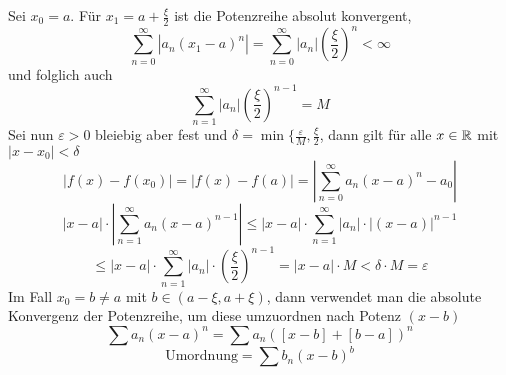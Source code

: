 \documentclass[../ana1u.tex]{subfiles}
\begin{document}
\begin{bew}
    Sei \(x_0 = a \). Für \(x_1 = a + \frac{\xi}{2} \) ist die Potenzreihe absolut konvergent, \dphp
    \[\sum_{n=0}^{\infty} |a_n(x_1-a)^n| = \sum_{n=0}^{\infty} |a_n| \left(\frac{\xi}{2}\right)^n < \infty \]
    und folglich auch 
    \[\sum_{n=1}^{\infty} |a_n| \left(\frac{\xi}{2}\right)^{n-1} = M \]
    Sei nun \(\varepsilon>0 \) bleiebig aber fest und \(\delta = \min \{\frac{\varepsilon}{M}, \frac{\xi}{2} \),
    dann gilt für alle \(x \in \mathbb{R} \) mit \(|x-x_0| < \delta \)
    \[|f(x)-f(x_0)| = |f(x)-f(a)| = \left|\sum_{n=0}^{\infty} a_n(x-a)^n-a_0\right| \]
    \[|x-a| \cdot \left|\sum_{n=1}^{\infty} a_n(x-a)^{n-1}\right| \leq |x-a| \cdot \sum_{n=1}^{\infty} |a_n| \cdot |(x-a)|^{n-1} \]
    \[\leq |x-a| \cdot \sum_{n=1}^{\infty} |a_n| \cdot \left(\frac{\xi}{2}\right)^{n-1} = |x-a| \cdot M < \delta \cdot M = \varepsilon \]
    Im Fall \(x_0=b \neq a \) mit \(b \in (a-\xi, a+\xi) \), dann verwendet man die absolute Konvergenz der Potenzreihe, um diese 
    umzuordnen nach Potenz \((x-b) \)
    \[\sum a_n(x-a)^n = \sum a_n([x-b]+[b-a])^n \]
    \[\text{Umordnung} = \sum b_n(x-b)^b \]
\end{bew}
\end{document}
